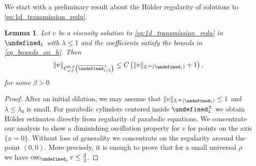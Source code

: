 \documentclass[12pt]{article}
\let\P\undefined
\numberwithin{Theorem}{section}
\newtheorem{Lemma}[Theorem]{Lemma}
\theoremstyle{definition}
\theoremstyle{remark}
\numberwithin{equation}{section}
\newcommand{\osc}{\operatorname{osc}}
\newcommand{\P}{\mathcal{P}}
\begin{document}
 
We start with a preliminary result about the H\"older regularity of solutions to \eqref{eq:1d_transmission_redu}.
\begin{Lemma} \label{lm:holder_reg1d}
    Let $v$ be a viscosity solution to \eqref{eq:1d_transmission_redu} in $\P_1$ with $\lambda \leq 1$ and the coefficients satisfy the bounds in \eqref{eq_bounds_on_h}.
    Then 
    \begin{equation} \label{eq:holder1d}
        \| v\|_{C_{x,t}^{0,\beta}\left( \overline{\P}_{1/2}^{\pm}\right)} \leq C \left( \| v\|_{L^{\infty}(\P_1)} +1 \right),
    \end{equation}
    for some $\beta >0$
    \end{Lemma}
\begin{proof} After an initial dilation, we may assume that $\| v\|_{L^{\infty}(\P_1)}\leq 1$ and $\lambda \leq \lambda_0$ is small. 
 For parabolic cylinders centered inside $\P_1^{\pm}$ we obtain H\"older estimates directly from regularity of parabolic equations.
 We concentrate our analysis to show a diminishing oscillation property for $v$ for points on the axis $\{x=0\}$.
  Without loss of generality we concentrate on the regularity around the point $(0,0)$.
  More precisely, it is enough to prove that for a small universal $\rho$ we have $\osc_{\P_\rho} v \leq \frac{3}{2}$.
  

\end{proof}
\end{document}
